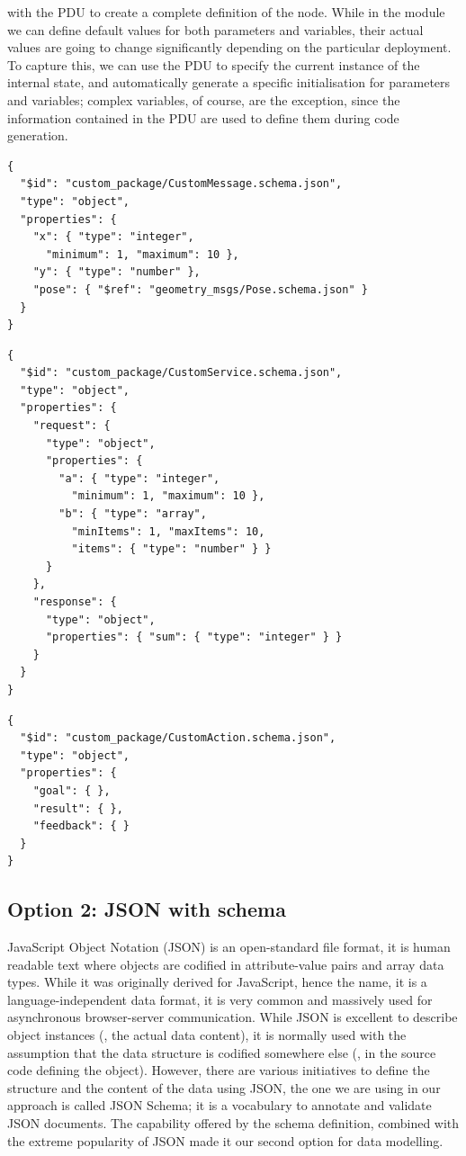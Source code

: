 with the PDU to create a complete definition of the node. While in the module we can define default values for both parameters and variables, their actual values are going to change significantly depending on the particular deployment. To capture this, we can use the PDU to specify the current instance of the internal state, and automatically generate a specific initialisation for parameters and variables; complex variables, of course, are the exception, since the information contained in the PDU are used to define them during code generation.

\begin{lstlisting}[float,frame=tb,caption={ROS message definition using JSON schema},label=lst:json-ros-msg]
{
  "$id": "custom_package/CustomMessage.schema.json",
  "type": "object",
  "properties": {
    "x": { "type": "integer",
      "minimum": 1, "maximum": 10 },
    "y": { "type": "number" },
    "pose": { "$ref": "geometry_msgs/Pose.schema.json" }
  }
}
\end{lstlisting}

\begin{lstlisting}[float,frame=tb,caption={ROS service definition using JSON schema},label=lst:json-ros-srv]
{
  "$id": "custom_package/CustomService.schema.json",
  "type": "object",
  "properties": {
    "request": {
      "type": "object",
      "properties": {
        "a": { "type": "integer",
          "minimum": 1, "maximum": 10 },
        "b": { "type": "array",
          "minItems": 1, "maxItems": 10,
          "items": { "type": "number" } }
      }
    },
    "response": {
      "type": "object",
      "properties": { "sum": { "type": "integer" } }
    }
  }
}
\end{lstlisting}

\begin{lstlisting}[float,frame=tb,caption={ROS action definition using JSON schema},label=lst:json-ros-act]
{
  "$id": "custom_package/CustomAction.schema.json",
  "type": "object",
  "properties": {
    "goal": { },
    "result": { },
    "feedback": { }
  }
}
\end{lstlisting}
 
\subsection{Option 2: JSON with schema}
 JavaScript Object Notation (JSON) is an open-standard file format, it is human readable text where objects are codified in attribute-value pairs and array data types. While it was originally derived for JavaScript, hence the name, it is a language-independent data format, it is very common and massively used for asynchronous browser-server communication. While JSON is excellent to describe object instances (\ie, the actual data content), it is normally used with the assumption that the data structure is codified somewhere else (\eg, in the source code defining the object). However, there are various initiatives to define the structure and the content of the data using JSON, the one we are using in our approach is called JSON Schema; it is a vocabulary to annotate and validate JSON documents. The capability offered by the schema definition, combined with the extreme popularity of JSON made it our second option for data modelling.
 
